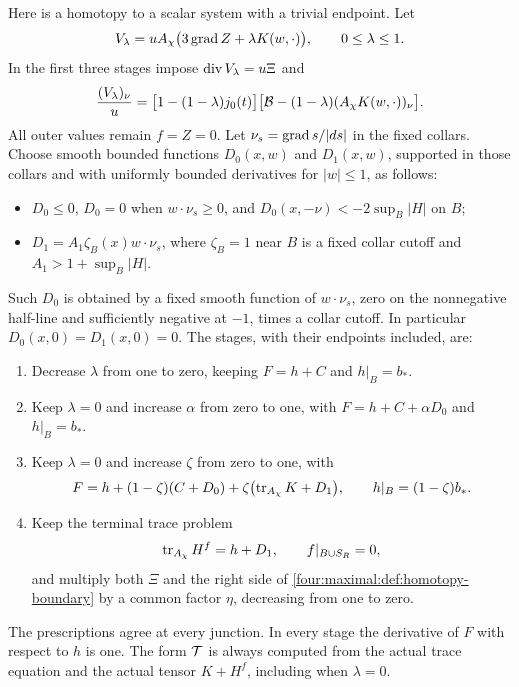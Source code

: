 Here is a homotopy to a scalar system with a trivial endpoint.
Let
\[
 V_\lambda=uA_\chi\bigl(3\operatorname{grad} Z+\lambda K(w,\cdot)\bigr),
 \qquad 0\le\lambda\le1.
\]
In the first three stages impose $\operatorname{div} V_\lambda=u\Xi$ and
\begin{equation}\label{four:maximal:def:homotopy-boundary}
 \frac{(V_\lambda)_\nu}{u}
 =\bigl[1-(1-\lambda)j_0(t)\bigr]
   \bigl[\mathcal B-(1-\lambda)
                (A_\chi K(w,\cdot))_\nu\bigr].
\end{equation}
All outer values remain $f=Z=0$.  Let $\nu_s=\operatorname{grad} s/|ds|$ in the fixed
collars.  Choose smooth bounded functions $D_0(x,w)$ and $D_1(x,w)$,
supported in those collars and with uniformly bounded derivatives for
$|w|\le1$, as follows:
\begin{itemize}
 \item $D_0\le0$, $D_0=0$ when $w\cdot \nu_s\ge0$, and
 $D_0(x,-\nu)<-2\sup_B|H|$ on $B$;
 \item $D_1=A_1\zeta_B(x)w\cdot \nu_s$, where $\zeta_B=1$ near $B$ is a
 fixed collar cutoff and $A_1>1+\sup_B|H|$.
\end{itemize}
Such $D_0$ is obtained by a fixed smooth function of $w\cdot \nu_s$, zero
on the nonnegative half-line and sufficiently negative at $-1$, times
a collar cutoff.  In particular $D_0(x,0)=D_1(x,0)=0$.
The stages, with their endpoints included, are:
\begin{enumerate}[label=\arabic*.]
 \item Decrease $\lambda$ from one to zero, keeping $F=h+C$ and
 $h|_B=b_*$.
 \item Keep $\lambda=0$ and increase $\alpha$ from zero to one, with
 $F=h+C+\alpha D_0$ and $h|_B=b_*$.
 \item Keep $\lambda=0$ and increase $\zeta$ from zero to one, with
 \begin{equation}\label{four:maximal:def:stage-three}
  F=h+(1-\zeta)(C+D_0)
       +\zeta\bigl(\operatorname{tr}_{A_\chi}K+D_1\bigr),
  \qquad h|_B=(1-\zeta)b_*.
 \end{equation}
 \item Keep the terminal trace problem
 \begin{equation}\label{four:maximal:def:terminal-trace}
  \operatorname{tr}_{A_\chi}H^f=h+D_1,\qquad f|_{B\cup S_R}=0,
 \end{equation}
 and multiply both $\Xi$ and the right side of
 \eqref{four:maximal:def:homotopy-boundary} by a common factor $\eta$, decreasing
 from one to zero.
\end{enumerate}
The prescriptions agree at every junction.  In every stage the
derivative of $F$ with respect to $h$ is one.  The form $\mathcal T$ is always
computed from the actual trace equation and the actual tensor $K+H^f$,
including when $\lambda=0$.

